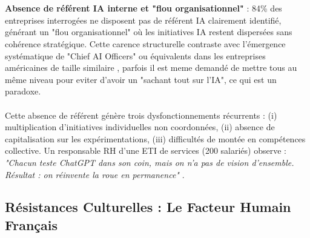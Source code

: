 \\\\
\textbf{Absence de référent IA interne et "flou organisationnel"} : 84\% des entreprises interrogées ne disposent pas de référent IA clairement identifié, générant un "flou organisationnel" où les initiatives IA restent dispersées sans cohérence stratégique. Cette carence structurelle contraste avec l'émergence systématique de "Chief AI Officers" ou équivalents dans les entreprises américaines de taille similaire \cite{deloitte2024aio}, parfois il est meme demandé de mettre tous au même niveau pour eviter d'avoir un "sachant tout sur l'IA", ce qui est un paradoxe.
\\\\
Cette absence de référent génère trois dysfonctionnements récurrents : (i) multiplication d'initiatives individuelles non coordonnées, (ii) absence de capitalisation sur les expérimentations, (iii) difficultés de montée en compétences collective. Un responsable RH d'une ETI de services (200 salariés) observe : \emph{"Chacun teste ChatGPT dans son coin, mais on n'a pas de vision d'ensemble. Résultat : on réinvente la roue en permanence"} \cite{luwai2025meetings}.

\subsection{Résistances Culturelles : Le Facteur Humain Français}

